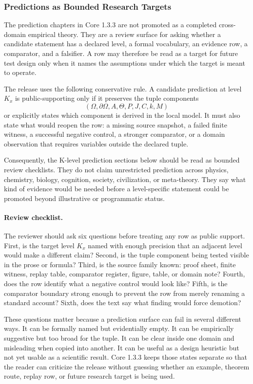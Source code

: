\subsubsection{Predictions as Bounded Research Targets}
\label{sec:predictions-bounded-r014}

The prediction chapters in Core 1.3.3 are not promoted as a completed
cross-domain empirical theory. They are a review surface for asking whether a
candidate statement has a declared level, a formal vocabulary, an evidence row,
a comparator, and a falsifier. A row may therefore be read as a target for
future test design only when it names the assumptions under which the target is
meant to operate.

The release uses the following conservative rule. A candidate prediction at
level \(K_x\) is public-supporting only if it preserves the tuple components
\[
  (\Omega,\partial\Omega,A,\Theta,P,J,C,k,M)
\]
or explicitly states which component is derived in the local model. It must also
state what would reopen the row: a missing source snapshot, a failed finite
witness, a successful negative control, a stronger comparator, or a domain
observation that requires variables outside the declared tuple.

Consequently, the K-level prediction sections below should be read as bounded
review checklists. They do not claim unrestricted prediction across physics,
chemistry, biology, cognition, society, civilization, or meta-theory. They say
what kind of evidence would be needed before a level-specific statement could be
promoted beyond illustrative or programmatic status.

\paragraph{Review checklist.}
The reviewer should ask six questions before treating any row as public
support. First, is the target level \(K_x\) named with enough precision that an
adjacent level would make a different claim? Second, is the tuple component
being tested visible in the prose or formula? Third, is the source family known:
proof sheet, finite witness, replay table, comparator register, figure, table,
or domain note? Fourth, does the row identify what a negative control would
look like? Fifth, is the comparator boundary strong enough to prevent the row
from merely renaming a standard account? Sixth, does the text say what finding
would force demotion?

These questions matter because a prediction surface can fail in several
different ways. It can be formally named but evidentially empty. It can be
empirically suggestive but too broad for the tuple. It can be clear inside one
domain and misleading when copied into another. It can be useful as a design
heuristic but not yet usable as a scientific result. Core 1.3.3 keeps those
states separate so that the reader can criticize the release without guessing
whether an example, theorem route, replay row, or future research target is
being used.

